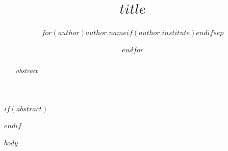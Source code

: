 \documentclass[runningheads,$if(papersize)$$papersize$$else$a4$endif$paper]{llncs}
\title{$title$}
\author{$for(author)$$author.name$$if(author.institute)$\inst{$author.institute$}$endif$$sep$ \and $endfor$}
\institute{$for(institutes)$$if(institutes.name)$$institutes.name$$endif$$if(institutes.emails)$$if(institutes.name)$\\$endif$
\email{$institutes.emails$}$endif$$sep$ \and $endfor$}
\begin{document}
\maketitle
$if(abstract)$
\begin{abstract}
$abstract$
\end{abstract}
$endif$

$body$
\end{document}
